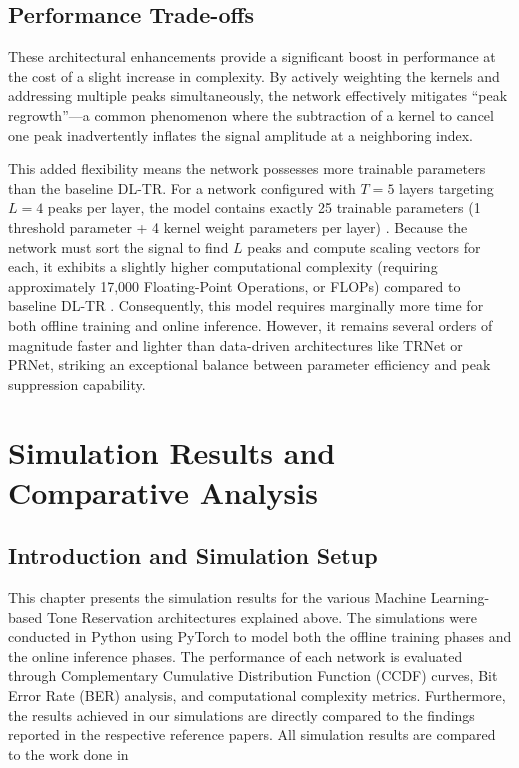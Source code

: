 \subsection{Performance Trade-offs}
These architectural enhancements provide a significant boost in performance at the cost of a slight increase in complexity. By actively weighting the kernels and addressing multiple peaks simultaneously, the network effectively mitigates ``peak regrowth''---a common phenomenon where the subtraction of a kernel to cancel one peak inadvertently inflates the signal amplitude at a neighboring index.

This added flexibility means the network possesses more trainable parameters than the baseline DL-TR. For a network configured with $T=5$ layers targeting $L=4$ peaks per layer, the model contains exactly 25 trainable parameters (1 threshold parameter + 4 kernel weight parameters per layer) \cite{extended_dl_tr}. Because the network must sort the signal to find $L$ peaks and compute scaling vectors for each, it exhibits a slightly higher computational complexity (requiring approximately 17,000 Floating-Point Operations, or FLOPs) compared to baseline DL-TR \cite{extended_dl_tr}. Consequently, this model requires marginally more time for both offline training and online inference. However, it remains several orders of magnitude faster and lighter than data-driven architectures like TRNet or PRNet, striking an exceptional balance between parameter efficiency and peak suppression capability.

\section{Simulation Results and Comparative Analysis}

\subsection{Introduction and Simulation Setup}
This chapter presents the simulation results for the various Machine Learning-based Tone Reservation architectures explained above. The simulations were conducted in Python using PyTorch to model both the offline training phases and the online inference phases. The performance of each network is evaluated through Complementary Cumulative Distribution Function (CCDF) curves, Bit Error Rate (BER) analysis, and computational complexity metrics. Furthermore, the results achieved in our simulations are directly compared to the findings reported in the respective reference papers. All simulation results are compared to the work done in \cite{dl_tr}

